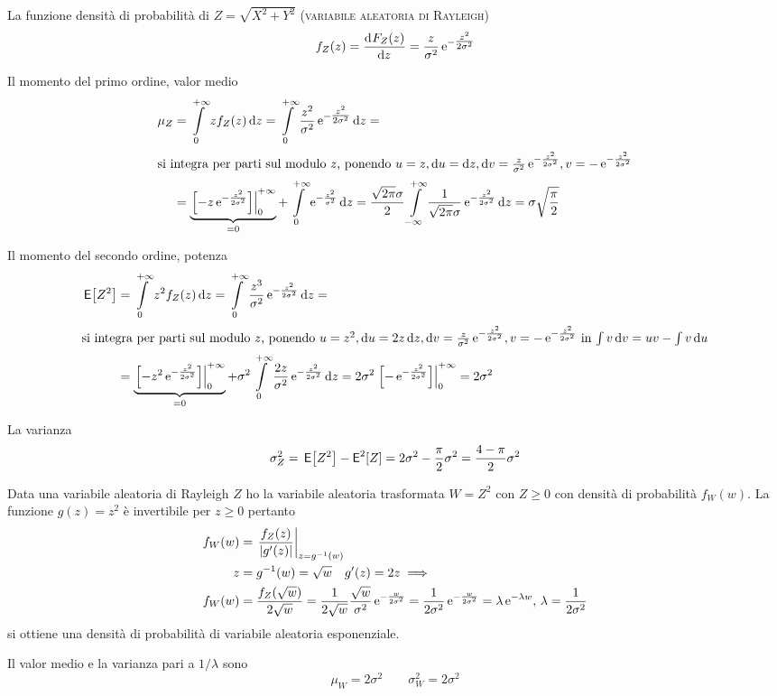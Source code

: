 \begin{esempio}
La funzione densità di probabilità di $Z=\sqrt{X^2+Y^2}$ (\textsc{variabile aleatoria di Rayleigh})\label{eq:Rayleigh}
\begin{equation}
\label{eq:formula_rayleigh}
	f_Z(z)=\deriv{F_Z(z)}{z}=\frac{z}{\sigma^2}\e{-\tfrac{z^2}{2\sigma^2}}
\end{equation}

Il momento del primo ordine, valor medio
\[
	\begin{split}
	\mu_Z&=\intd{0}{+\infty}{z f_Z(z)}{z}=\intd{0}{+\infty}{\frac{z^2}{\sigma^2}\e{-\tfrac{z^2}{2\sigma^2}}}{z}=\\
\intertext{si integra per parti sul modulo $z$, ponendo $u=z, \diff u=\diff z, \diff v=\frac{z}{\sigma^2}\e{-\frac{z^2}{2\sigma^2}}, v=-\e{-\frac{z^2}{2\sigma^2}}$}
	&=\underbrace{\bound{0}{+\infty}{-z\e{-\frac{z^2}{2\sigma^2}}}}_{=0}+\intd{0}{+\infty}{\e{-\frac{z^2}{\sigma^2}}}{z}=\frac{\sqrt{2\pi}\sigma}{2}\intinf{\frac{1}{\sqrt{2\pi}\sigma}\e{-\frac{z^2}{2\sigma^2}}}{z}=\sigma\sqrt{\frac{\pi}{2}}
\end{split}
\]

Il momento del secondo ordine, potenza
\[	
\begin{split}
	\E{Z^2}&=\intd{0}{+\infty}{z^2 f_Z(z)}{z}=\intd{0}{+\infty}{\frac{z^3}{\sigma^2}\e{-\frac{z^2}{2\sigma^2}}}{z}=\\
\intertext{si integra per parti sul modulo $z$, ponendo $u=z^2, \diff u=2z\diff z, \diff v=\frac{z}{\sigma^2}\e{-\frac{z^2}{2\sigma^2}}, v=-\e{-\frac{z^2}{2\sigma^2}}$ in $\int v\diff v=u v-\int v\diff u$}
	&=\underbrace{\bound{0}{+\infty}{-z^2\e{-\frac{z^2}{2\sigma^2}}}}_{=0}+\sigma^2\intd{0}{+\infty}{\frac{2z}{\sigma^2}\e{-\frac{z^2}{2\sigma^2}}}{z}=2\sigma^2\bound{0}{+\infty}{-\e{-\frac{z^2}{2\sigma^2}}}=2\sigma^2
\end{split}
\]

La varianza
\[
	\sigma^2_Z=\E{Z^2}-\Esp^2[Z]=2\sigma^2-\frac{\pi}{2}\sigma^2=\frac{4-\pi}{2}\sigma^2
\]
\end{esempio}

\begin{esempio}
Data una variabile aleatoria di Rayleigh $Z$ ho la variabile aleatoria trasformata $W=Z^2$ con $Z\geq 0$ con densità di probabilità $f_W(w)$. La funzione $g(z)=z^2$ è invertibile per $z\geq 0$ pertanto
\begin{align*}
	f_W(w)&=\restrict{\frac{f_Z(z)}{\abs{g'(z)}}}{z=g^{-1}(w)} \\
	z&=g^{-1}(w)=\sqrt{w}\quad g'(z)=2z \implies \\
	f_W(w)&=\frac{f_Z(\sqrt{w})}{2\sqrt{w}}=\frac{1}{2\sqrt{w}}\frac{\sqrt{w}}{\sigma^2}\e{-\frac{w}{2\sigma^2}}=\frac{1}{2\sigma^2}\e{-\frac{w}{2\sigma^2}}=\lambda\e{-\lambda w},\,\lambda=\frac{1}{2\sigma^2}
\end{align*}
si ottiene una densità di probabilità di variabile aleatoria esponenziale.

Il valor medio e la varianza pari a $1/\lambda$ sono
\[
	\mu_W=2\sigma^2\qquad\sigma^2_W=2\sigma^2
\]
\end{esempio}


